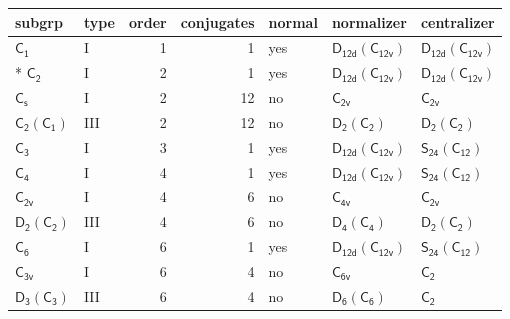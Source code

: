 \documentclass[10pt,a4paper]{article}
\numberwithin{equation}{section}
\newcommand{\grp}[1]{\mathsf{#1}}
\begin{document}
{\small\begin{longtable}{@{}llrrlll@{}}\toprule
subgrp & type & order & conjugates & normal & normalizer & centralizer\\\midrule\endhead
\bottomrule\endfoot\endlastfoot
\href{../../../rotation/data/pdf/C1.pdf}{$\grp{C_{1}}$} & I & 1 & 1 & yes & \href{D12d-C12v.pdf}{$\grp{D_{12d}}(\grp{C_{12v}})$} & \href{D12d-C12v.pdf}{$\grp{D_{12d}}(\grp{C_{12v}})$}\\*
\href{../../../rotation/data/pdf/C2.pdf}{$\grp{C_{2}}$} & I & 2 & 1 & yes & \href{D12d-C12v.pdf}{$\grp{D_{12d}}(\grp{C_{12v}})$} & \href{D12d-C12v.pdf}{$\grp{D_{12d}}(\grp{C_{12v}})$}\\
\href{../../../rotation/data/pdf/C1v.pdf}{$\grp{C_{s}}$} & I & 2 & 12 & no & \href{../../../rotation/data/pdf/C2v.pdf}{$\grp{C_{2v}}$} & \href{../../../rotation/data/pdf/C2v.pdf}{$\grp{C_{2v}}$}\\
\href{C2-C1.pdf}{$\grp{C_{2}}(\grp{C_{1}})$} & III & 2 & 12 & no & \href{D2-C2.pdf}{$\grp{D_{2}}(\grp{C_{2}})$} & \href{D2-C2.pdf}{$\grp{D_{2}}(\grp{C_{2}})$}\\
\href{../../../rotation/data/pdf/C3.pdf}{$\grp{C_{3}}$} & I & 3 & 1 & yes & \href{D12d-C12v.pdf}{$\grp{D_{12d}}(\grp{C_{12v}})$} & \href{S24-C12.pdf}{$\grp{S_{24}}(\grp{C_{12}})$}\\
\href{../../../rotation/data/pdf/C4.pdf}{$\grp{C_{4}}$} & I & 4 & 1 & yes & \href{D12d-C12v.pdf}{$\grp{D_{12d}}(\grp{C_{12v}})$} & \href{S24-C12.pdf}{$\grp{S_{24}}(\grp{C_{12}})$}\\
\href{../../../rotation/data/pdf/C2v.pdf}{$\grp{C_{2v}}$} & I & 4 & 6 & no & \href{../../../rotation/data/pdf/C4v.pdf}{$\grp{C_{4v}}$} & \href{../../../rotation/data/pdf/C2v.pdf}{$\grp{C_{2v}}$}\\
\href{D2-C2.pdf}{$\grp{D_{2}}(\grp{C_{2}})$} & III & 4 & 6 & no & \href{D4-C4.pdf}{$\grp{D_{4}}(\grp{C_{4}})$} & \href{D2-C2.pdf}{$\grp{D_{2}}(\grp{C_{2}})$}\\
\href{../../../rotation/data/pdf/C6.pdf}{$\grp{C_{6}}$} & I & 6 & 1 & yes & \href{D12d-C12v.pdf}{$\grp{D_{12d}}(\grp{C_{12v}})$} & \href{S24-C12.pdf}{$\grp{S_{24}}(\grp{C_{12}})$}\\
\href{../../../rotation/data/pdf/C3v.pdf}{$\grp{C_{3v}}$} & I & 6 & 4 & no & \href{../../../rotation/data/pdf/C6v.pdf}{$\grp{C_{6v}}$} & \href{../../../rotation/data/pdf/C2.pdf}{$\grp{C_{2}}$}\\
\href{D3-C3.pdf}{$\grp{D_{3}}(\grp{C_{3}})$} & III & 6 & 4 & no & \href{D6-C6.pdf}{$\grp{D_{6}}(\grp{C_{6}})$} & \href{../../../rotation/data/pdf/C2.pdf}{$\grp{C_{2}}$}\\

\end{longtable}}
\end{document}
